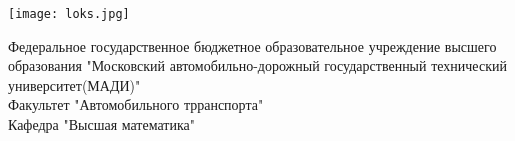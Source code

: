\begin{titlepage}
\begin{minipage}[b]{0.2\textwidth}

\texttt{[image: loks.jpg]}
\end{minipage}

\begin{center}
\LARGE
Федеральное государственное бюджетное образовательное 
учреждение высшего образования "Московский автомобильно-дорожный 
государственный технический университет(МАДИ)"\\

Факультет "Автомобильного трранспорта"\\

Кафедра "Высшая математика"

\end{center}
\end{titlepage}